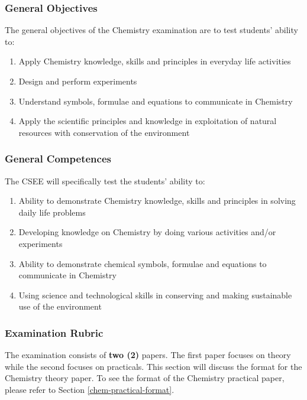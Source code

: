 \subsubsection{General Objectives}
\noindent The general objectives of the Chemistry examination are to test students' ability to:
\begin{enumerate}
	\item Apply Chemistry knowledge, skills and principles in everyday life activities
	\item Design and perform experiments
	\item Understand symbols, formulae and equations to communicate in Chemistry
	\item Apply the scientific principles and knowledge in exploitation of natural resources with conservation of the environment
\end{enumerate}

\subsubsection{General Competences}
\noindent The CSEE will specifically test the students' ability to:
\begin{enumerate}
	\item Ability to demonstrate Chemistry knowledge, skills and principles in solving daily life problems
	\item Developing knowledge on Chemistry by doing various activities and/or experiments
	\item Ability to demonstrate chemical symbols, formulae and equations to communicate in Chemistry
	\item Using science and technological skills in conserving and making sustainable use of the environment
\end{enumerate}

\subsubsection{Examination Rubric}
\noindent The examination consists of \textbf{two (2)} papers. The first paper focuses on theory while the second focuses on practicals. This section will discuss the format for the Chemistry theory paper. To see the format of the Chemistry practical paper, please refer to Section \ref{chem-practical-format}. \\

